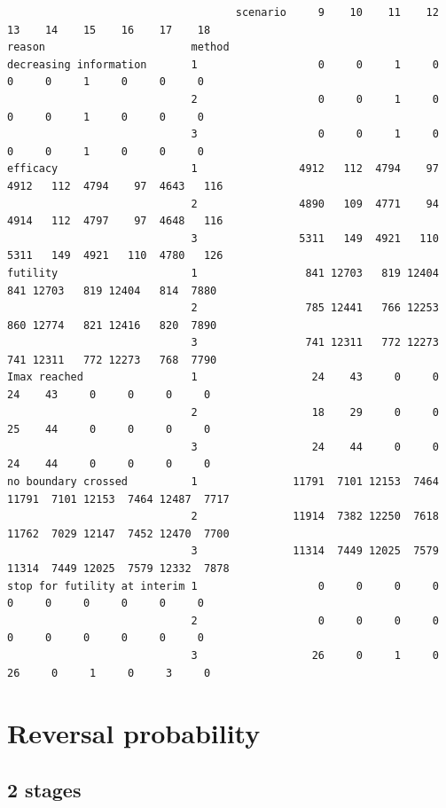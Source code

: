 \documentclass[12pt]{article}
\begin{document}
\begin{verbatim}
                                    scenario     9    10    11    12    13    14    15    16    17    18
reason                       method                                                                     
decreasing information       1                   0     0     1     0     0     0     1     0     0     0
                             2                   0     0     1     0     0     0     1     0     0     0
                             3                   0     0     1     0     0     0     1     0     0     0
efficacy                     1                4912   112  4794    97  4912   112  4794    97  4643   116
                             2                4890   109  4771    94  4914   112  4797    97  4648   116
                             3                5311   149  4921   110  5311   149  4921   110  4780   126
futility                     1                 841 12703   819 12404   841 12703   819 12404   814  7880
                             2                 785 12441   766 12253   860 12774   821 12416   820  7890
                             3                 741 12311   772 12273   741 12311   772 12273   768  7790
Imax reached                 1                  24    43     0     0    24    43     0     0     0     0
                             2                  18    29     0     0    25    44     0     0     0     0
                             3                  24    44     0     0    24    44     0     0     0     0
no boundary crossed          1               11791  7101 12153  7464 11791  7101 12153  7464 12487  7717
                             2               11914  7382 12250  7618 11762  7029 12147  7452 12470  7700
                             3               11314  7449 12025  7579 11314  7449 12025  7579 12332  7878
stop for futility at interim 1                   0     0     0     0     0     0     0     0     0     0
                             2                   0     0     0     0     0     0     0     0     0     0
                             3                  26     0     1     0    26     0     1     0     3     0
\end{verbatim}

\clearpage

\section{Reversal probability}
\label{sec:org45c6a85}

\subsection{2 stages}
\label{sec:org3318b02}
\end{document}
